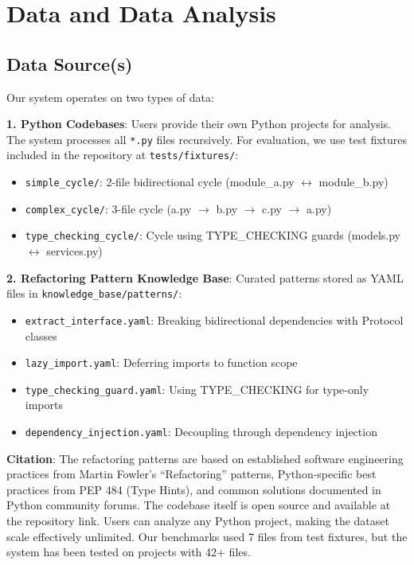 \documentclass[paper=a4, fontsize=11pt]{scrartcl} %
\begin{document}
\section{Data and Data Analysis}
\subsection{Data Source(s)}

Our system operates on two types of data:

\textbf{1. Python Codebases}: Users provide their own Python projects for analysis. The system processes all \texttt{*.py} files recursively. For evaluation, we use test fixtures included in the repository at \texttt{tests/fixtures/}:
\begin{itemize}
    \item \texttt{simple\_cycle/}: 2-file bidirectional cycle (module\_a.py $\leftrightarrow$ module\_b.py)
    \item \texttt{complex\_cycle/}: 3-file cycle (a.py $\rightarrow$ b.py $\rightarrow$ c.py $\rightarrow$ a.py)
    \item \texttt{type\_checking\_cycle/}: Cycle using TYPE\_CHECKING guards (models.py $\leftrightarrow$ services.py)
\end{itemize}

\textbf{2. Refactoring Pattern Knowledge Base}: Curated patterns stored as YAML files in \texttt{knowledge\_base/patterns/}:
\begin{itemize}
    \item \texttt{extract\_interface.yaml}: Breaking bidirectional dependencies with Protocol classes
    \item \texttt{lazy\_import.yaml}: Deferring imports to function scope
    \item \texttt{type\_checking\_guard.yaml}: Using TYPE\_CHECKING for type-only imports
    \item \texttt{dependency\_injection.yaml}: Decoupling through dependency injection
\end{itemize}

\textbf{Citation}: The refactoring patterns are based on established software engineering practices from Martin Fowler's ``Refactoring'' patterns, Python-specific best practices from PEP 484 (Type Hints), and common solutions documented in Python community forums. The codebase itself is open source and available at the repository link. Users can analyze any Python project, making the dataset scale effectively unlimited. Our benchmarks used 7 files from test fixtures, but the system has been tested on projects with 42+ files.
\end{document}
